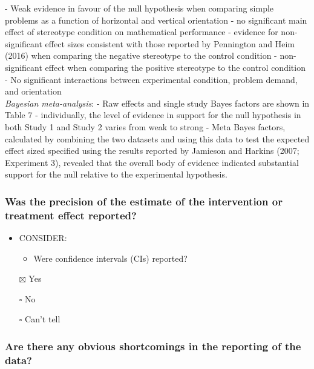\documentclass[
  doc, a4paper]{apa7}
\providecommand{\tightlist}{%
  \setlength{\itemsep}{0pt}\setlength{\parskip}{0pt}}
\begin{document}
- Weak evidence in favour of the null hypothesis when comparing simple problems as a function of horizontal and vertical orientation
- no significant main effect of stereotype condition on mathematical performance
- evidence for non-significant effect sizes consistent with those reported by Pennington and Heim (2016) when comparing the negative stereotype to the control condition
- non-significant effect when comparing the positive stereotype to the control condition
- No significant interactions between experimental condition, problem demand, and orientation\\
\emph{Bayesian meta-analysis}:
- Raw effects and single study Bayes factors are shown in Table 7
- individually, the level of evidence in support for the null hypothesis in both Study 1 and Study 2 varies from weak to strong
- Meta Bayes factors, calculated by combining the two datasets and using this data to test the expected effect sized specified using the results reported by Jamieson and Harkins (2007; Experiment 3), revealed that the overall body of evidence indicated substantial support for the null relative to the experimental hypothesis.

\subsubsection{Was the precision of the estimate of the intervention or treatment effect reported?}\label{was-the-precision-of-the-estimate-of-the-intervention-or-treatment-effect-reported}

\begin{itemize}
\tightlist
\item
  CONSIDER:

  \begin{itemize}
  \tightlist
  \item
    Were confidence intervals (CIs) reported?
  \end{itemize}
\item[$\boxtimes$]
  Yes
\item[$\square$]
  No
\item[$\square$]
  Can't tell
\end{itemize}

\subsubsection{Are there any obvious shortcomings in the reporting of the data?}\label{are-there-any-obvious-shortcomings-in-the-reporting-of-the-data}
\end{document}
